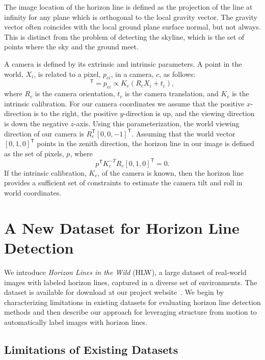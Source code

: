 \documentclass{bmvc2k}
\begin{document}
The image location of the horizon line is defined as the projection of
the line at infinity for any plane which is orthogonal to the local
gravity vector. The gravity vector often coincides with the local
ground plane surface normal, but not always.  This is distinct from
the problem of detecting the skyline, which is the set of points
where the sky and the ground meet. 
    
A camera is defined by its extrinsic and intrinsic parameters.  A
point in the world, $X_i$, is related to a pixel, $p_{ci}$, in
a camera, $c$, as follows: 
\begin{equation}
  [u_{ci},v_{ci},1]^\mathsf{T} = p_{ci} \propto K_c(R_c X_i + t_c),
\end{equation}
where $R_c$ is the camera orientation, $t_c$ is the camera
translation, and $K_c$ is the intrinsic calibration.  For our camera
coordinates we assume that the positive $x$-direction is to the right,
the positive $y$-direction is up, and the viewing direction is down
the negative $z$-axis. Using this parameterization, the world viewing
direction of our camera is $R_c^\mathsf{T}[0,0,-1]^\mathsf{T}$.
Assuming that the world vector $[0,1,0]^\mathsf{T}$ points in the
zenith direction, the horizon line in our image is defined as the set
of pixels, $p$, where 
\begin{equation}
  p^\mathsf{T}K_c^{-T}R_c[0,1,0]^\mathsf{T} = 0.
\end{equation}
If the intrinsic calibration, $K_c$, of the camera is known, then the
horizon line provides a sufficient set of constraints to estimate the
camera tilt and roll in world coordinates.


\section{A New Dataset for Horizon Line Detection}

We introduce {\em Horizon Lines in the Wild} (HLW), a large dataset of
real-world images with labeled horizon lines, captured in a diverse
set of environments. 
The dataset is available for download at
our project website~\cite{hlwsite}.
We begin by characterizing limitations in existing
datasets for evaluating horizon line detection methods and then
describe our approach for leveraging structure from motion to
automatically label images with horizon lines.

\subsection{Limitations of Existing Datasets}
\end{document}
